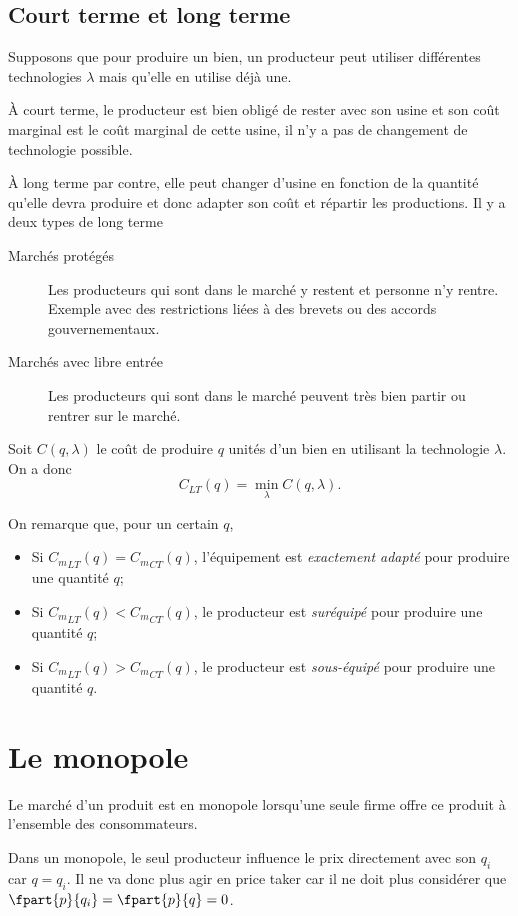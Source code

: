 \subsection{Court terme et long terme}
Supposons que pour produire un bien, un producteur peut utiliser
différentes technologies $\lambda$ mais qu'elle en utilise déjà une.

À court terme, le producteur est bien obligé de rester avec son usine
et son coût marginal est le coût marginal de cette usine, il n'y a pas
de changement de technologie possible.

À long terme par contre, elle peut changer d'usine en fonction de la quantité
qu'elle devra produire et donc adapter son coût et répartir les productions.
Il y a deux types de long terme
\begin{description}
  \item[Marchés protégés]
    Les producteurs qui sont dans le marché y restent et personne n'y rentre.
    Exemple avec des restrictions liées à des brevets ou des accords gouvernementaux.
  \item[Marchés avec libre entrée]
    Les producteurs qui sont dans le marché peuvent très bien partir ou rentrer sur le marché.
\end{description}

Soit $C(q,\lambda)$ le coût de produire $q$ unités d'un bien en utilisant
la technologie $\lambda$.
On a donc
\[ C_{LT}(q) = \min_\lambda C(q,\lambda). \]

On remarque que, pour un certain $q$,
\begin{itemize}
  \item Si ${C_m}_{LT}(q) = {C_m}_{CT}(q)$,
    l'équipement est \emph{exactement adapté} pour produire une quantité $q$;
  \item Si ${C_m}_{LT}(q) < {C_m}_{CT}(q)$,
    le producteur est \emph{suréquipé} pour produire une quantité $q$;
  \item Si ${C_m}_{LT}(q) > {C_m}_{CT}(q)$,
    le producteur est \emph{sous-équipé} pour produire une quantité $q$.
\end{itemize}

\section{Le monopole}
Le marché d'un produit est en monopole lorsqu'une seule firme
offre ce produit à l'ensemble des consommateurs.

Dans un monopole,
le seul producteur influence le prix directement avec son $q_i$ car $q = q_i$.
Il ne va donc plus agir en price taker car il ne doit plus
considérer que $\fpart{p}{q_i} = \fpart{p}{q} = 0$.

